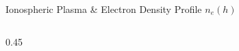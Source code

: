\documentclass[aspectratio=169, 10pt]{beamer}
\begin{document}
\begin{frame}{Ionospheric Plasma \& Electron Density Profile $n_e(h)$}
\begin{columns}[c]
\begin{column}{0.45\textwidth}
                
                


        \end{column}
    \end{columns}
\end{frame}
\end{document}
